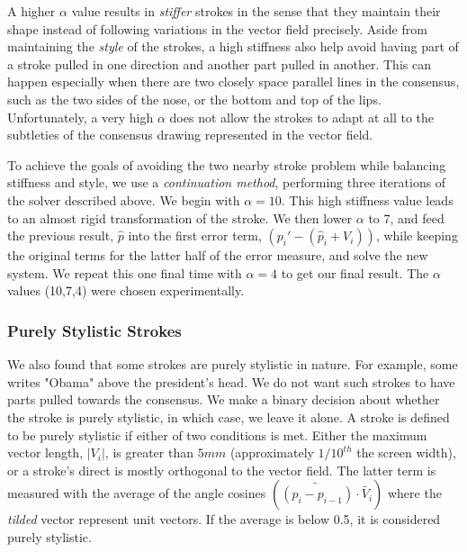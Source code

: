 A higher $\alpha$ value results in {\em stiffer} strokes in the sense that they maintain their shape instead of following variations in the vector field precisely. Aside from maintaining the {\em style} of the strokes, a high stiffness also help avoid having part of a stroke pulled in one direction and another part pulled in another. This can happen especially when there are two closely space parallel lines in the consensus, such as the two sides of the nose, or the bottom and top of the lips. Unfortunately, a very high $\alpha$ does not allow the strokes to adapt at all to the subtleties of the consensus drawing represented in the vector field.

To achieve the goals of avoiding the two nearby stroke problem while balancing stiffness and style, we use a {\em continuation method}, performing three iterations of the solver described above. We begin with $\alpha=10$. This high stiffness value leads to an almost rigid transformation of the stroke. We then lower $\alpha$ to 7, and feed the previous result, $\hat{p}$ into the first error term, $(p_i' - (\hat{p}_i + V_i))$, while keeping the original terms for the latter half of the error measure, and solve the new system. We repeat this one final time with $\alpha=4$ to get our final result. The $\alpha$ values (10,7,4) were chosen experimentally.

\subsubsection{Purely Stylistic Strokes}

We also found that some strokes are purely stylistic in nature. For example, some writes "Obama" above the president's head. We do not want such strokes to have parts pulled towards the consensus. We make a binary decision about whether the stroke is purely stylistic, in which case, we leave it alone. A stroke is defined to be purely stylistic if either of two conditions is met. Either the maximum vector length, $|V_i|$, is greater than $5mm$ (approximately $1/10^{th}$ the screen width), or a stroke's direct is mostly orthogonal to the vector field. The latter term is measured with the average of the angle cosines $(\tilde{(p_i - p_{i-1})} \cdot \tilde{V_i})$ where the {\em tilded} vector represent unit vectors. If the average is below 0.5, it is considered purely stylistic.





